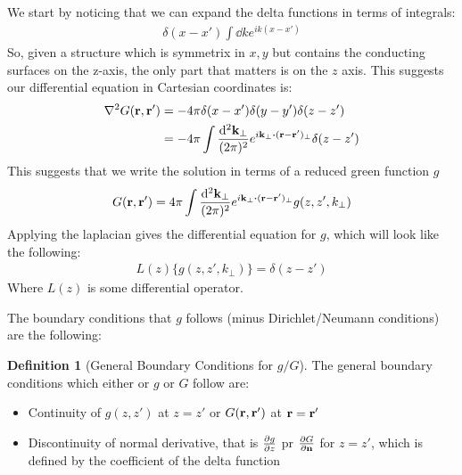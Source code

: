 \documentclass[12pt]{article}
\theoremstyle{plain}
\theoremstyle{definition}
\newtheorem{definition}{Definition}[section]
\begin{document}
We start by noticing that we can expand the delta functions in terms of integrals:
\begin{align*}
  \delta(x-x')\int\dd{k}e^{ik(x-x')}
\end{align*}
So, given a structure which is symmetrix in $x,y$ but contains the conducting surfaces on the z-axis, the only part that matters is on the $z$ axis. This suggests our differential equation in Cartesian coordinates is:
\begin{align*}
  \laplacian{G(\vb{r,r}')}&=-4\pi\delta(x-x')\delta(y-y')\delta(z-z')\\
  &=-4\pi\int\frac{\dd[2]{\vb{k}_\perp}}{(2\pi)^2}
  e^{i\vb{k}_\perp\vdot(\vb{r-r'})_\perp}\delta(z-z')
\end{align*}
This suggests that we write the solution in terms of a reduced green function $g$
\begin{align*}
  G(\vb{r,r}')=4\pi\int\frac{\dd[2]{\vb{k}_\perp}}{(2\pi)^2}
  e^{i\vb{k}_\perp\vdot(\vb{r-r'})_\perp}g(z,z',k_\perp)
\end{align*}
Applying the laplacian gives the differential equation for $g$, which will look like the following:
\begin{align*}
  L(z)\{g(z,z',k_\perp)\}=\delta(z-z')
\end{align*}
Where $L(z)$ is some differential operator.

The boundary conditions that $g$ follows (minus Dirichlet/Neumann conditions) are the following:
\begin{definition}[General Boundary Conditions for $g/G$]
  The general boundary conditions which either or $g$ or $G$ follow are:
  \begin{itemize}
  \item Continuity of $g(z,z')$ at $z=z'$ or $G(\vb{r,r}')$ at $\vb{r=r}'$
  \item Discontinuity of normal derivative, that is $\pdv{g}{z}$ pr $\pdv{G}{\vb{n}}$ for $z=z'$, which is defined by the coefficient of the delta function
  \end{itemize}
\end{definition}
\end{document}
